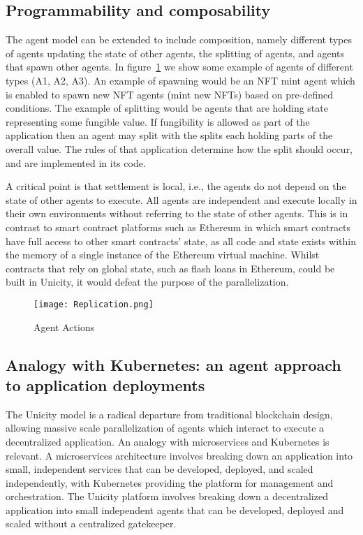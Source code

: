 \documentclass{article}
\begin{document}
\subsection{Programmability and composability}

The agent model can be extended to include composition, namely different types of agents updating the state of other agents, the splitting of agents, and agents that spawn other agents. In figure~\ref{fig:AgentSpawn} we show some example of agents of different types (A1, A2, A3). An example of spawning would be an NFT mint agent which is enabled to spawn new NFT agents (mint new NFTs) based on pre-defined conditions. The example of splitting would be agents that are holding state representing some fungible value. If fungibility is allowed as part of the application then an agent may split with the splits each holding parts of the overall value. The rules of that application determine how the split should occur, and are implemented in its code.



A critical point is that settlement is local, i.e., the agents do not depend on the state of other agents to execute. All agents are independent and execute locally in their own environments without referring to the state of other agents. This is in contrast to smart contract platforms such as Ethereum in which smart contracts have full access to other smart contracts' state, as all code and state exists within the memory of a single instance of the Ethereum virtual machine. Whilst contracts that rely on global state, such as flash loans in Ethereum, could be built in Unicity, it would defeat the purpose of the parallelization.

\begin{figure}[H]
    \centering
    \texttt{[image: Replication.png]}
    \caption{Agent Actions}
    \label{fig:AgentSpawn}
\end{figure}


\subsection{Analogy with Kubernetes: an agent approach to application deployments}

The Unicity model is a radical departure from traditional blockchain design, allowing massive scale parallelization of agents which interact to execute a decentralized application. An analogy with microservices and Kubernetes is relevant. A microservices architecture involves breaking down an application into small, independent services that can be developed, deployed, and scaled independently, with Kubernetes providing the platform for management and orchestration. The Unicity platform involves breaking down a decentralized application into small independent agents that can be developed, deployed and scaled without a centralized gatekeeper.
\end{document}
